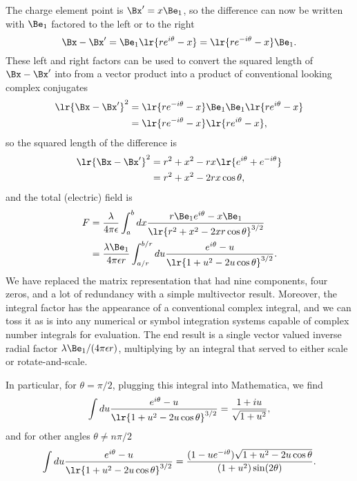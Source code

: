 The charge element point is \( \Bx' = x \Be_1 \), so the difference can now be written with \( \Be_1 \) factored to the left or to the right
\begin{equation}\label{eqn:linecharge:20}
\Bx - \Bx'
= \Be_1\lr{ r e^{i\theta} - x }
= \lr{ r e^{-i\theta} - x } \Be_1.
\end{equation}
These left and right factors can be used to convert the squared length of \( \Bx - \Bx' \) into from a vector product into a product of conventional looking complex conjugates
\begin{equation}\label{eqn:linecharge:40}
\begin{aligned}
\lr{ \Bx - \Bx' }^2
&= \lr{ r e^{-i\theta} - x } \Be_1 \Be_1\lr{ r e^{i\theta} - x } \\
&= \lr{ r e^{-i\theta} - x } \lr{ r e^{i\theta} - x },
\end{aligned}
\end{equation}
so the squared length of the difference is
\begin{equation}\label{eqn:linecharge:300}
\begin{aligned}
\lr{ \Bx - \Bx' }^2
&= r^2 + x^2 - r x \lr{ e^{i\theta} + e^{-i\theta} } \\
&= r^2 + x^2 - 2 r x \cos\theta,
\end{aligned}
\end{equation}
and the total (electric) field is
\begin{equation}\label{eqn:linecharge:60}
\begin{aligned}
F
&= \frac{\lambda}{4 \pi \epsilon} \int_a^b dx \frac{ r \Be_1 e^{i\theta} - x \Be_1 }{ \lr{ r^2 + x^2 - 2 x r \cos\theta }^{3/2} } \\
&= \frac{\lambda \Be_1}{4 \pi \epsilon r} \int_{a/r}^{b/r} du \frac{ e^{i\theta} - u }{ \lr{ 1 + u^2 - 2 u \cos\theta }^{3/2} }.
\end{aligned}
\end{equation}
We have replaced the matrix representation that had nine components, four zeros, and a lot of redundancy with a simple multivector result.
Moreover, the integral factor has the appearance of a conventional complex integral, and we can toss it as is into any numerical or symbol integration systems capable of complex number integrals for evaluation.
The end result is a single vector valued inverse radial factor \( \lambda \Be_1/ (4 \pi \epsilon r) \), multiplying by an integral that served to either scale or rotate-and-scale.

In particular, for \( \theta = \pi/2 \), plugging this integral into Mathematica, we find
\begin{equation}\label{eqn:linecharge:80}
\int
du \frac{ e^{i\theta} - u }{ \lr{ 1 + u^2 - 2 u \cos\theta }^{3/2} }
= \frac{1 + i u}{\sqrt{1 + u^2}},
\end{equation}
and for other angles \( \theta \neq n \pi/2 \)
\begin{equation}\label{eqn:linecharge:100}
\int
du \frac{ e^{i\theta} - u }{ \lr{ 1 + u^2 - 2 u \cos\theta }^{3/2} }
= \frac{(1 -u e^{-i\theta}) \sqrt{1 + u^2 - 2 u \cos\theta}}{(1 + u^2) \sin(2\theta)}.
\end{equation}

